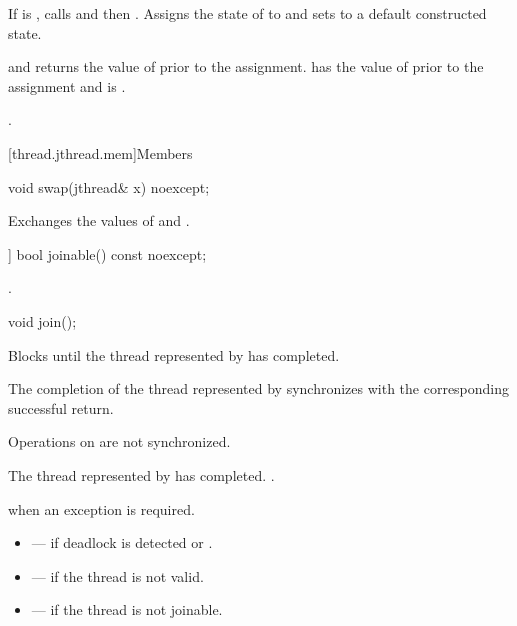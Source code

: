 \begin{itemdescr}
\pnum
\effects
If  is ,
calls  and then .
Assigns the state of  to 
and sets  to a default constructed state.

\pnum
\ensures
{}
and  returns the value of 
prior to the assignment.
 has the value of 
prior to the assignment
and  is .

\pnum
\returns
{}.
\end{itemdescr}

[thread.jthread.mem]{Members}

%
\begin{itemdecl}
void swap(jthread& x) noexcept;
\end{itemdecl}

\begin{itemdescr}
\pnum
\effects
Exchanges the values of  and .
\end{itemdescr}


%
\begin{itemdecl}
[[nodiscard]] bool joinable() const noexcept;
\end{itemdecl}

\begin{itemdescr}
\pnum
\returns
{}.
\end{itemdescr}

%
\begin{itemdecl}
void join();
\end{itemdecl}

\begin{itemdescr}
\pnum
\effects
Blocks until the thread represented by  has completed.

\pnum
\sync
The completion of the thread represented by 
synchronizes with
the corresponding successful  return.
\begin{note}
Operations on  are not synchronized.
\end{note}

\pnum
\ensures
The thread represented by  has completed.
.

\pnum
\throws
{} when an exception is required.

\pnum
\errors
\begin{itemize}
\item {} --- if deadlock is detected or
.

\item {} --- if the thread is not valid.

\item {} --- if the thread is not joinable.
\end{itemize}
\end{itemdescr}

